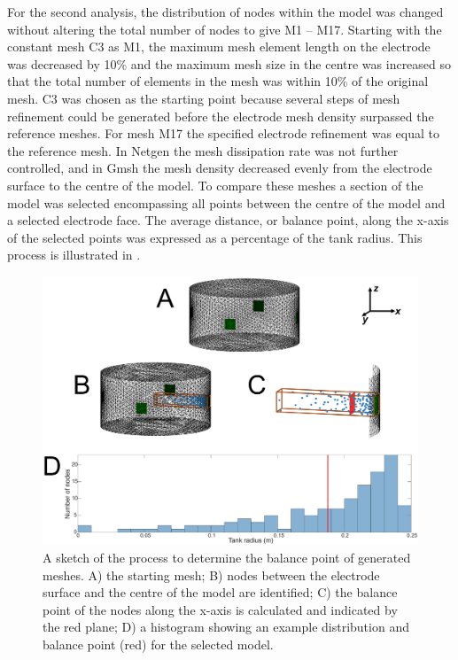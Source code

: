 For the second analysis, the distribution of nodes within the 
model was changed without altering 
the total number of nodes to give M1 -- M17. 
Starting with the constant mesh C3 as M1, the maximum mesh element 
length on the electrode was decreased by 10\% and the maximum mesh size in the centre was
increased so that the total number of elements in the mesh was  within 10\% of the 
original mesh. C3 was chosen as the starting point because several steps of mesh 
refinement could be generated before the electrode mesh density surpassed the reference meshes. 
For mesh M17 the specified electrode refinement was equal to the reference mesh. 
In Netgen the mesh dissipation rate was not further controlled, and in Gmsh the mesh density 
decreased evenly from the electrode surface to the centre of the model. 
To compare these meshes a section of the model was selected
encompassing all points between the centre of the model and a selected electrode face.
The average 
distance, or balance point, along the x-axis of the selected points was expressed 
as a percentage of the tank radius.
This process is illustrated in .
 
\begin{figure}
  \includegraphics[width=\columnwidth]{chapter4-mesh_refinement/imgs/balance_methods.pdf}
  \caption[Balance point calculation method]{\label{fig:balanceMethods} A sketch of the process to determine the 
  balance point of generated meshes. A) the starting mesh; B) nodes between the
  electrode surface and the centre of the model are identified; C) the 
  balance point of the nodes along the x-axis is calculated and indicated 
  by the red plane; D) a histogram showing an example distribution and balance point (red)
  for the selected model.}
\end{figure}

